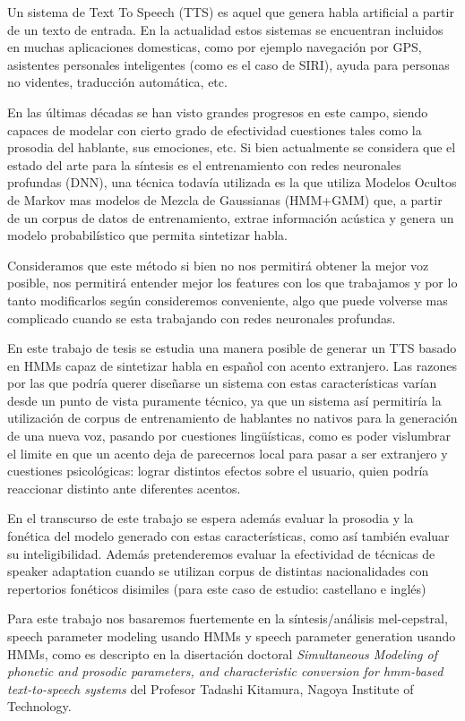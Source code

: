 
\noindent Un sistema de Text To Speech (TTS) es aquel que genera habla artificial a partir de un texto de entrada. En la actualidad estos sistemas se encuentran incluidos en muchas aplicaciones domesticas, como por ejemplo navegación por GPS, asistentes personales inteligentes (como es el caso de SIRI), ayuda para personas no videntes, traducción automática, etc.

\noindent En las últimas décadas se han visto grandes progresos en este campo, siendo capaces de modelar con cierto grado de efectividad cuestiones tales como la prosodia del hablante, sus emociones, etc. Si bien actualmente se considera que el estado del arte para la síntesis es el entrenamiento con redes neuronales profundas (DNN), una técnica todavía utilizada es la que utiliza Modelos Ocultos de Markov mas modelos de Mezcla de Gaussianas (HMM+GMM) que, a partir de un corpus de datos de entrenamiento, extrae información acústica y genera un modelo probabilístico que permita sintetizar habla. 

\noindent Consideramos que este método si bien no nos permitirá obtener la mejor voz posible, nos permitirá entender mejor los features con los que trabajamos y por lo tanto modificarlos según consideremos conveniente, algo que puede volverse mas complicado cuando se esta trabajando con redes neuronales profundas.

\noindent En este trabajo de tesis se estudia una manera posible de generar un TTS basado en HMMs capaz de sintetizar habla en español con acento extranjero. Las razones por las que podría querer diseñarse un sistema con estas características varían desde un punto de vista puramente técnico, ya que un sistema así permitiría la utilización de corpus de entrenamiento de hablantes no nativos para la generación de una nueva voz, pasando por cuestiones lingüísticas, como es poder vislumbrar el limite en que un acento deja de parecernos local para pasar a ser extranjero y cuestiones psicológicas: lograr distintos efectos sobre el usuario, quien podría reaccionar distinto ante diferentes acentos.

\noindent En el transcurso de este trabajo se espera además evaluar la prosodia y la fonética del modelo generado con estas características, como así también evaluar su inteligibilidad. Además pretenderemos evaluar la efectividad de técnicas de speaker adaptation cuando se utilizan corpus de distintas nacionalidades con repertorios fonéticos disimiles (para este caso de estudio: castellano e inglés)

\noindent Para este trabajo nos basaremos fuertemente en la síntesis/análisis mel-cepstral, speech parameter modeling usando HMMs y speech parameter generation usando HMMs, como es descripto en la disertación doctoral \textit{Simultaneous Modeling of phonetic and prosodic parameters, and characteristic conversion for hmm-based text-to-speech systems} del Profesor Tadashi Kitamura, Nagoya Institute of Technology\cite{phoneticAndProsodic}.


